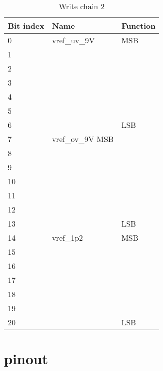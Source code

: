 \begin{table}[!htbp]
\centering
\begin{tabular}{@{}lll@{}}
\toprule
Bit index & Name & Function \\ \toprule
0 &	vref_uv_9V	 & MSB \\
1 & & \\
2 & & \\
3 & & \\
4 & & \\
5 & & \\
6	&	& LSB \\
7	& vref_ov_9V MSB \\
8  & & \\
9  & & \\
10 & & \\
11 & & \\
12 & & \\
13 & & LSB \\
14 & vref_1p2 &	MSB \\
15 & & \\
16 & & \\
17 & & \\
18 & & \\
19 & & \\
20 & & LSB \\
\bottomrule
\end{tabular}
\caption{Write chain 2}
\label{tab:write-chain-2}
\end{table}

\section{pinout}
\label{apx:testchip-pinout}
